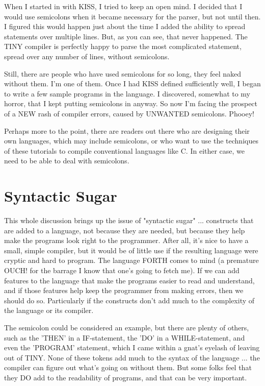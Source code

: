 When I started in with KISS, I tried  to  keep  an  open mind. I decided that I would use  semicolons when it became necessary for the parser, but not until then. I figured this would happen just about  the time I added the ability  to  spread  statements  over multiple lines. But, as you  can  see, that never happened. The TINY compiler is perfectly  happy  to  parse the most complicated statement, spread over any number of lines, without semicolons.

Still, there are people  who  have  used  semicolons for so long, they feel naked  without them. I'm one of them. Once I had KISS defined sufficiently well, I began to write a few sample programs in the language. I  discovered, somewhat to my horror, that I kept  putting  semicolons  in anyway. So  now  I'm  facing  the prospect of a NEW  rash  of  compiler  errors, caused by UNWANTED semicolons. Phooey!

Perhaps more to the point, there are readers out  there  who  are designing their own languages, which may  include  semicolons, or who  want to use the techniques of  these  tutorials  to  compile conventional languages like  C. In  either case, we need to be able to deal with semicolons.

\section{Syntactic Sugar}

This whole discussion brings  up  the  issue of "syntactic sugar" ... constructs that are added to a language, not because they are needed, but because they help make the programs look right to the programmer. After  all, it's nice  to  have  a  small, simple compiler, but  it  would  be  of  little  use if the resulting language  were  cryptic  and hard to program. The language FORTH comes  to mind (a premature OUCH! for the  barrage  I  know  that one's going to fetch me). If we can add features to the language that  make the programs easier to read  and  understand, and  if those features  help keep the programmer from making errors, then we should do so. Particularly if the constructs don't add much to the complexity of the language or its compiler.

The  semicolon  could  be considered an example, but  there  are plenty of others, such as the 'THEN' in a IF-statement, the 'DO' in a WHILE-statement, and  even the 'PROGRAM' statement, which I came within a gnat's eyelash of leaving out  of  TINY. None of these tokens  add  much  to  the  syntax  of the language ... the compiler can figure out  what's  going on without them. But some folks feel that they  DO  add to the readability of programs, and that can be very important.

